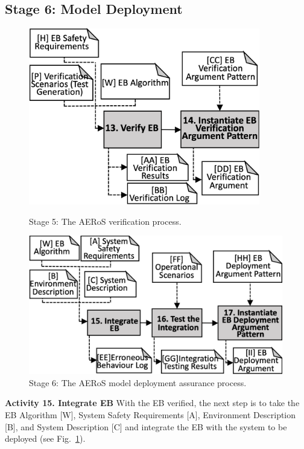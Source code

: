 \documentclass[runningheads]{llncs}
\begin{document}
\subsection{Stage 6: Model Deployment} \label{framework-stage6}
\begin{figure}[!t]
	\centering
	\begin{minipage}[b]{.47\textwidth}
			\centering
			\includegraphics[width=0.9\textwidth]{figures/AERoS-Stage5-v2.png}%
			\vspace{-2ex}
			\caption{Stage 5: The AERoS verification process.}
			\label{amlas-a-stage5}
	      \end{minipage}%
      \hspace*{0.01\textwidth}
	\begin{minipage}[b]{.5\textwidth}
			\centering
			\includegraphics[width=0.99\textwidth]{figures/AERoS-Stage6-v2.png}%
			\vspace{-2ex}
			\caption{Stage 6: The AERoS model \newline deployment assurance process.}
			\label{amlas-a-stage6}
		\end{minipage}
	\vspace{-4ex}
\end{figure}
\noindent\textbf{Activity 15. Integrate EB} With the EB verified, the next step is to take the EB Algorithm [W], System Safety Requirements [A], Environment Description [B], and System Description [C] and integrate the EB with the system to be deployed (see Fig.~\ref{amlas-a-stage6}). 
\end{document}
